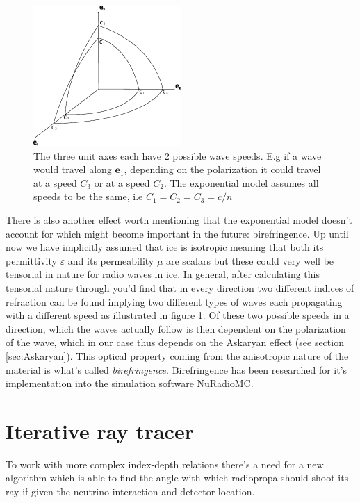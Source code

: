 \begin{figure}
  \centering
  \includegraphics[width=0.5\textwidth]{figures/Fresnel.pdf}
  \caption{The three unit axes each have 2 possible wave speeds. E.g if a wave would
  travel along $\mathbf{e}_1$, depending on the polarization it could travel at a speed $C_3$ or
  at a speed $C_2$. The exponential model assumes all speeds to be the same, i.e $C_1=C_2=C_3=c/n$}
  \label{fig:Fresnel}
\end{figure}

There is also another effect worth mentioning that the exponential model
doesn't account for which might become important in the future: birefringence.
Up until now we have implicitly assumed that ice is isotropic meaning that both
its permittivity $\varepsilon$ and its permeability $\mu$ are scalars but
these could very well be tensorial in nature for radio waves in ice. In
general, after calculating this tensorial nature through you'd find that in
every direction two different indices of refraction can be found implying two
different types of waves each propagating with a different speed as illustrated
in figure \ref{fig:Fresnel}.  Of these two possible speeds in a direction, which the waves actually
follow is then dependent on the polarization of the wave, which in our case thus depends
on the Askaryan effect (see section \ref{sec:Askaryan}).  This optical property
coming from the anisotropic nature of the material is what's called
\textit{birefringence}.  Birefringence has been researched for it's
implementation into the simulation software NuRadioMC\cite{Heyer2023}.
\newpage
\section{Iterative ray tracer}
\label{sec:Iterative}
To work with more complex index-depth relations there's a need for a
new algorithm which is able to find the angle with which radiopropa should
shoot its ray if given the neutrino interaction and detector location.

